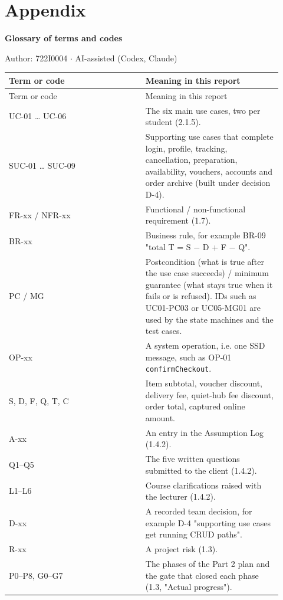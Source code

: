 \section*{Appendix}
\textbf{Glossary of terms and codes}

Author: 722I0004 \ensuremath{\cdot} AI-assisted (Codex, Claude)

\begin{longtable}{>{\raggedright\arraybackslash}p{0.4600\linewidth}>{\raggedright\arraybackslash}p{0.4600\linewidth}}
Term or code & Meaning in this report \\
\hline\endfirsthead
Term or code & Meaning in this report \\
\hline\endhead
UC-01 \ldots{} UC-06 & The six main use cases, two per student (2.1.5). \\
SUC-01 \ldots{} SUC-09 & Supporting use cases that complete login, profile, tracking, cancellation, preparation, availability, vouchers, accounts and order archive (built under decision D-4). \\
FR-xx / NFR-xx & Functional / non-functional requirement (1.7). \\
BR-xx & Business rule, for example BR-09 "total T = S \ensuremath{-} D + F \ensuremath{-} Q". \\
PC / MG & Postcondition (what is true after the use case succeeds) / minimum guarantee (what stays true when it fails or is refused). IDs such as UC01-PC03 or UC05-MG01 are used by the state machines and the test cases. \\
OP-xx & A system operation, i.e. one SSD message, such as OP-01 \texttt{confirmCheckout}. \\
S, D, F, Q, T, C & Item subtotal, voucher discount, delivery fee, quiet-hub fee discount, order total, captured online amount. \\
A-xx & An entry in the Assumption Log (1.4.2). \\
Q1--Q5 & The five written questions submitted to the client (1.4.2). \\
L1--L6 & Course clarifications raised with the lecturer (1.4.2). \\
D-xx & A recorded team decision, for example D-4 "supporting use cases get running CRUD paths". \\
R-xx & A project risk (1.3). \\
P0--P8, G0--G7 & The phases of the Part 2 plan and the gate that closed each phase (1.3, "Actual progress"). \\

\end{longtable}
